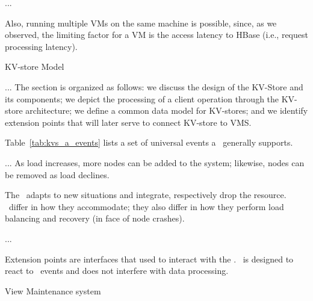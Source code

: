 %
%


...

Also, running multiple VMs on the same machine is possible, since, as
we observed, the limiting factor for a VM is the access latency to
HBase (i.e., request processing latency).

KV-store Model
%
%

...
The section is organized as follows: we discuss
the design of the KV-Store and its components; we depict the
processing of a client operation through the KV-store architecture; we
define a common data model for KV-stores; and we identify extension
points that will later serve to connect KV-store to VMS.

Table~\ref{tab:kvs_a_events} lists a set of universal events a
\KVS\ generally supports.

  
  
...
As load increases, more nodes can be added to the system; likewise,
nodes can be removed as load declines.

The \KVS\ adapts to new situations and integrate, respectively drop
the resource. \KVSs\ differ in how they accommodate; they also differ
in how they perform load balancing and recovery (in face of node
crashes).

...
%
%

Extension points are interfaces that used to interact with the
\KVS. \VMS\ is designed to react to \KVS\ events and does not
interfere with data processing.



View Maintenance system

